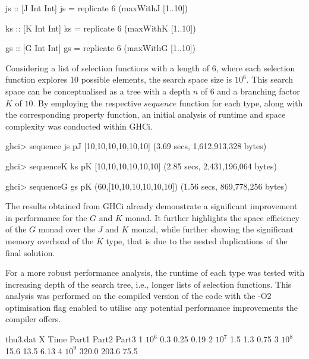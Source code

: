 \documentclass[runningheads]{llncs}
\begin{document}
\begin{code}
js :: [J Int Int]
js = replicate 6 (maxWithJ [1..10])

ks :: [K Int Int]
ks = replicate 6 (maxWithK [1..10])

gs :: [G Int Int]
gs = replicate 6 (maxWithG [1..10])
\end{code}

Considering a list of selection functions with a length of \(6\), where
each selection function explores \(10\) possible elements, the search
space size is \(10^6\). This search space can be conceptualised as a
tree with a depth \(n\) of \(6\) and a branching factor \(K\) of \(10\).
By employing the respective \(sequence\) function for each type, along
with the corresponding property function, an initial analysis of runtime
and space complexity was conducted within GHCi.

\begin{haskell}
ghci> sequence js pJ 
[10,10,10,10,10,10]
(3.69 secs, 1,612,913,328 bytes)

ghci> sequenceK ks pK
[10,10,10,10,10,10]
(2.85 secs, 2,431,196,064 bytes)

ghci> sequenceG gs pK
(60,[10,10,10,10,10,10])
(1.56 secs, 869,778,256 bytes)
\end{haskell}

The results obtained from GHCi already demonstrate a significant
improvement in performance for the \(G\) and \(K\) monad. It further
highlights the space efficiency of the \(G\) monad over the \(J\) and
\(K\) monad, while further showing the significant memory overhead of
the \(K\) type, that is due to the nested duplications of the final
solution.

\qquad For a more robust performance analysis, the runtime of each type
was tested with increasing depth of the search tree, i.e., longer lists
of selection functions. This analysis was performed on the compiled
version of the code with the -O2 optimisation flag enabled to utilise
any potential performance improvements the compiler offers.

\begin{filecontents}{thu3.dat}
X Time      Part1   Part2   Part3
1 $10^6$      0.3       0.25    0.19
2 $10^7$      1.5     1.3     0.75
3 $10^8$      15.6    13.5    6.13
4 $10^9$      320.0   203.6   75.5
\end{filecontents}
\end{document}
